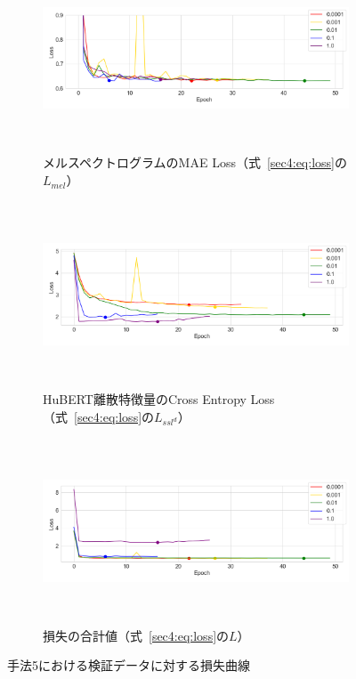\documentclass[12pt]{jarticle}
\numberwithin{equation}{section}    %
\numberwithin{figure}{section}      %
\numberwithin{table}{section}      %
\begin{document}
\begin{figure}[bt]
    \centering
    \begin{subfigure}{\linewidth}
        \centering
        \includegraphics[height=55mm]{./figure/sec4/loss_curve/5/mel_loss.png}
        \caption{メルスペクトログラムのMAE Loss（式~\eqref{sec4:eq:loss}の$L_{mel}$）}
        \label{sec4:fig:method_5_val_mel_loss}
    \end{subfigure}
    \begin{subfigure}{\linewidth}
        \centering
        \includegraphics[height=55mm]{./figure/sec4/loss_curve/5/ssl_feature_cluster_loss.png}
        \caption{HuBERT離散特徴量のCross Entropy Loss（式~\eqref{sec4:eq:loss}の$L_{ssl^{d}}$）}
        \label{sec4:fig:method_5_val_ssl_feature_cluster_loss}
    \end{subfigure}
    \begin{subfigure}{\linewidth}
        \centering
        \includegraphics[height=55mm]{./figure/sec4/loss_curve/5/total_loss.png}
        \caption{損失の合計値（式~\eqref{sec4:eq:loss}の$L$）}
        \label{sec4:fig:method_5_val_total_loss}
    \end{subfigure}
    \caption{手法5における検証データに対する損失曲線}
    \label{sec4:fig:method_5_val_losses}
\end{figure}
\end{document}
